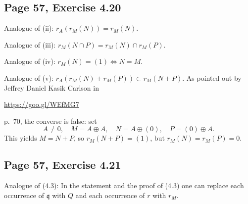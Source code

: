 \documentclass[parskip=half,fontsize=12pt]{scrartcl}%
\newcommand{\mf}{\mathfrak}
\newcommand{\ppp}{\mf p}
\newcommand{\qqq}{\mf q}
\begin{document}
\subsection{Page 57, Exercise 4.20}%

Analogue of (ii): $r_A(r_M(N))=r_M(N)$. 

Analogue of (iii): $r_M(N\cap P)=r_M(N)\cap r_M(P)$. 

Analogue of (iv): $r_M(N)=(1)\iff N=M$.

Analogue of (v): $r_A(r_M(N)+r_M(P))\subset r_M(N+P)$. As pointed out by Jeffrey Daniel Kasik Carlson in\medskip 

\centerline{\href{https://goo.gl/WEfMG7}{https://goo.gl/WEfMG7}}

p.~70, the converse is false: set 
$$
A\ne0,\quad M=A\oplus A,\quad N=A\oplus(0),\quad P=(0)\oplus A.
$$ 
This yields $M=N+P$, so $r_M(N+P)=(1)$, but $r_M(N)=r_M(P)=0$. %

\subsection{Page 57, Exercise 4.21}%

Analogue of (4.3): In the statement and the proof of (4.3) one can replace each occurrence of $\qqq$ with $Q$ and each occurrence of $r$ with $r_M$. 

%
\begin{comment}
Let $Q_1$ and $Q_2$ be $\ppp$-primary in $M$, and let us show that $Q_1\cap Q_2$ is also $\ppp$-primary in $M$. Let $a\in A$, $x\in M$, $x\notin Q_1\cap Q_2$ satisfy $ax\in Q_1\cap Q_2$. We can assume $x\notin Q_1$. We get $a\in\ppp$, and thus $a^nM\subset Q_1\cap Q_2$ for some $n$.

One can also modify the statement and the proof in the book according to the following table: 
$$
\begin{array}{|c|c|c|c|c|c|c|}\hline
\qqq_i&\qqq&r(\qqq)&r(\qqq_i)&y\in A&xy\in\qqq&y\notin\qqq_i\\ \hline
Q_i&Q&r_M(Q)&r_M(Q_i)&y\in M&xy\in Q&y\notin Q_i\\ \hline
\end{array}
$$ 
\end{comment}
%
\end{document}
